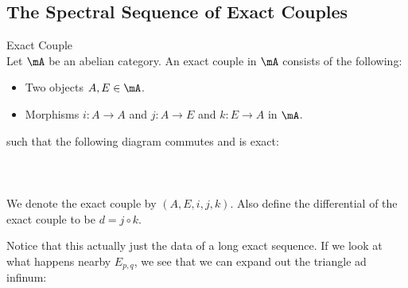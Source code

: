 \documentclass[a4paper]{article}
\begin{document}
\subsection{The Spectral Sequence of Exact Couples}
\begin{defn}{Exact Couple}{}\\
Let $\mA$ be an abelian category. An exact couple in $\mA$ consists of the following: 
\begin{itemize}
\item Two objects $A,E\in\mA$. 
\item Morphisms $i:A\to A$ and $j:A\to E$ and $k:E\to A$ in $\mA$. 
\end{itemize}
such that the following diagram commutes and is exact: \\~\\
\\~\\
We denote the exact couple by $(A,E,i,j,k)$. Also define the differential of the exact couple to be $d=j\circ k$. 
\end{defn}

Notice that this actually just the data of a long exact sequence. If we look at what happens nearby $E_{p,q}$, we see that we can expand out the triangle ad infinum: \\~\\
\\~\\
\end{document}
